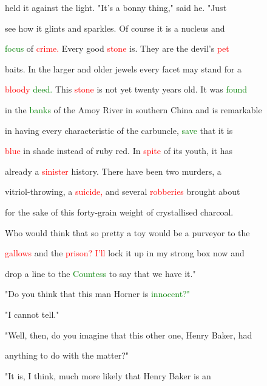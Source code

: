  held it against the light. "It's a bonny thing," said he. "Just

 see how it glints and \textcolor{BurntOrange}{sparkles.} Of course it is a nucleus and

 \textcolor{green}{focus} of \textcolor{red}{crime.} Every \textcolor{BurntOrange}{good} \textcolor{red}{stone} is. They are the \textcolor{BurntOrange}{devil's} \textcolor{red}{pet}

 \textcolor{BurntOrange}{baits.} In the larger and older jewels every facet may stand for a

 \textcolor{red}{bloody} \textcolor{green}{deed.} This \textcolor{red}{stone} is not yet twenty years old. It was \textcolor{green}{found}

 in the \textcolor{green}{banks} of the Amoy River in southern China and is \textcolor{BurntOrange}{remarkable}

 in having every characteristic of the carbuncle, \textcolor{green}{save} that it is

 \textcolor{red}{blue} in shade instead of ruby red. In \textcolor{red}{spite} of its \textcolor{BurntOrange}{youth,} it has

 already a \textcolor{red}{sinister} history. There have been two \textcolor{BurntOrange}{murders,} a

 vitriol-throwing, a \textcolor{red}{suicide,} and several \textcolor{red}{robberies} brought about

 for the sake of this forty-grain \textcolor{BurntOrange}{weight} of crystallised charcoal.

 Who would think that so \textcolor{BurntOrange}{pretty} a toy would be a purveyor to the

 \textcolor{red}{gallows} and the \textcolor{red}{prison?} \textcolor{red}{I'll} lock it up in my strong box now and

 drop a line to the \textcolor{green}{Countess} to say that we have it."



 "Do you think that this man Horner is \textcolor{green}{innocent?"}



 "I cannot tell."



 "Well, then, do you imagine that this other one, Henry Baker, had

 anything to do with the matter?"



 "It is, I think, much more likely that Henry Baker is an

